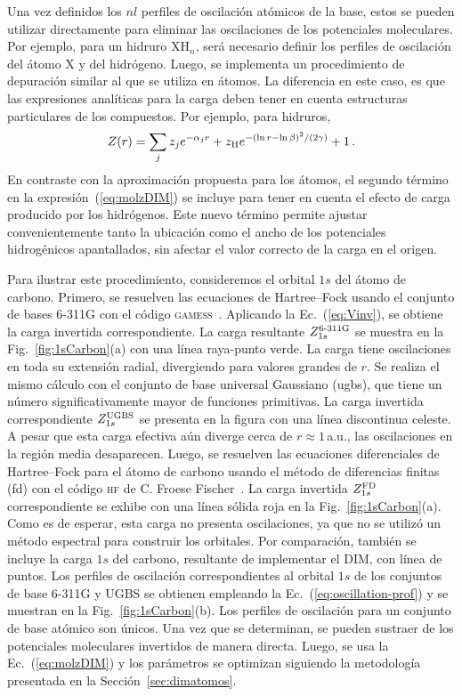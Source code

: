 Una vez definidos los $nl$ perfiles de oscilación atómicos de la base, 
estos se pueden utilizar directamente para eliminar las oscilaciones de 
los potenciales moleculares. Por ejemplo, para un hidruro XH$_n$, será  
necesario definir los perfiles de oscilación del átomo X y del 
hidrógeno. Luego, se implementa un procedimiento de depuración similar 
al que se utiliza en átomos. La diferencia en este caso, es que las 
expresiones analíticas para la carga deben tener en cuenta estructuras 
particulares de los compuestos. Por ejemplo, para hidruros,
\begin{eqnarray}
 Z(r) = \sum_j z_j e^{-\alpha_j r} 
 + z_{\mbox{\scriptsize H}} e^{-(\ln r - \ln \beta)^2/(2\gamma)} 
 + 1\,.
 \label{eq:molzDIM}
\end{eqnarray}
En contraste con la aproximación propuesta para los átomos, el segundo 
término en la expresión~(\ref{eq:molzDIM}) se incluye para tener en 
cuenta el efecto de carga producido por los hidrógenos. Este nuevo 
término permite ajustar convenientemente tanto la ubicación como el 
ancho de los potenciales hidrogénicos apantallados, sin afectar el valor 
correcto de la carga en el origen.

Para ilustrar este procedimiento, consideremos el orbital $1s$ del átomo 
de carbono. Primero, se resuelven las ecuaciones de Hartree--Fock usando 
el conjunto de bases \mbox{6-311G} con el código 
\textsc{gamess}~\cite{Schmidt:93,Gordon:05}. Aplicando la 
Ec.~(\ref{eq:Vinv}), se obtiene la carga invertida correspondiente. La 
carga resultante $Z_{1s}^{\mbox{\scriptsize 6-311G}}$ se muestra en la 
Fig.~\ref{fig:1sCarbon}(a) con una línea raya-punto verde. La carga 
tiene oscilaciones en toda su extensión radial, divergiendo para valores 
grandes de $r$. Se realiza el mismo cálculo con el conjunto de base 
universal Gaussiano (\acs{ugbs}), que tiene un número significativamente 
mayor de funciones primitivas. La carga invertida correspondiente 
$Z_{1s}^{\mbox{\scriptsize UGBS}}$ se presenta en la figura con una 
línea discontinua celeste. A pesar que esta carga efectiva aún diverge 
cerca de $r\approx1\,$a.u., las oscilaciones en la región media 
desaparecen. Luego, se resuelven las ecuaciones diferenciales de 
Hartree--Fock para el átomo de carbono usando el método de diferencias 
finitas (\acs{fd}) con el código \textsc{hf} de C. Froese 
Fischer~\cite{FroeseFischer:97}. La carga invertida 
$Z_{1s}^{\mbox{\scriptsize FD}}$ correspondiente se exhibe con una línea 
sólida roja en la Fig.~\ref{fig:1sCarbon}(a). Como es de esperar, esta 
carga no presenta oscilaciones, ya que no se utilizó un método espectral 
para construir los orbitales. Por comparación, también se incluye la 
carga $1s$ del carbono, resultante de implementar el DIM, con línea de 
puntos. Los perfiles de oscilación correspondientes al orbital $1s$ de 
los conjuntos de base \mbox{6-311G} y UGBS se obtienen empleando la 
Ec.~(\ref{eq:oscillation-prof}) y se muestran en la 
Fig.~\ref{fig:1sCarbon}(b). Los perfiles de oscilación para un conjunto 
de base atómico son únicos. Una vez que se determinan, se pueden 
sustraer de los potenciales moleculares invertidos de manera directa. 
Luego, se usa la Ec.~(\ref{eq:molzDIM}) y los parámetros se optimizan 
siguiendo la metodología presentada en la Sección~\ref{sec:dimatomos}.

